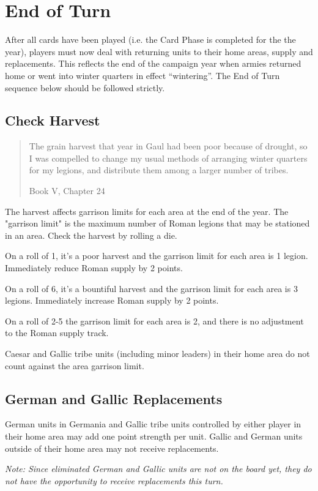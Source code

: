 \section{End of Turn}
\par
After all cards have been played (i.e. the Card Phase is completed for the the year), players must now deal with returning units to their home areas, supply and replacements. This reflects the end of the campaign year when armies returned home or went into winter quarters in effect “wintering”. The End of Turn sequence below should be followed strictly.

\subsection{Check Harvest}
\blockquote[Book V, Chapter 24]{The grain harvest that year in Gaul had been poor because of drought, so I was compelled to change my usual methods of arranging winter quarters for my legions, and distribute them among a larger number of tribes.}
\par
The harvest affects garrison limits for each area at the end of the year. The "garrison limit" is the maximum number of Roman legions that may be stationed in an area. Check the harvest by rolling a die.

On a roll of 1, it’s a poor harvest and the garrison limit for each area is 1 legion. Immediately reduce Roman supply by 2 points.

On a roll of 6, it’s a bountiful harvest and the garrison limit for each area is 3 legions. Immediately increase Roman supply by 2 points.

On a roll of 2-5 the garrison limit for each area is 2, and there is no adjustment to the Roman supply track.

Caesar and Gallic tribe units (including minor leaders) in their home area do not count against the area garrison limit.

\raggedbottom

\subsection{German and Gallic Replacements}
\par
German units in Germania and Gallic tribe units controlled by either player in their home area may add one point strength per unit. Gallic and German units outside of their home area may not receive replacements.

\textit{Note: Since eliminated German and Gallic units are not on the board yet, they do not have the opportunity to receive replacements this turn.}

